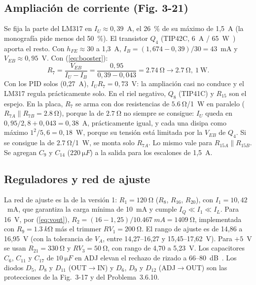 \documentclass[conference]{IEEEtran}
\begin{document}
\subsection{Ampliación de corriente (Fig. 3-21)}
Se fija la parte del LM317 en $I_U\approx0{,}39$~A, el 26~\% de su máximo de 1,5~A (la monografía pide menos del 50~\%). El transistor $Q_4$ (TIP42C, 6~A / 65~W~\cite{tip4x}) aporta el resto. Con $h_{FE}\approx30$ a 1,3~A, $I_B=(1{,}674-0{,}39)/30=43$~mA y $V_{EB}\approx0{,}95$~V. Con (\ref{eq:booster}):
\begin{equation}
R_7=\frac{V_{EB}}{I_U-I_B}=\frac{0{,}95}{0{,}39-0{,}043}=\SI{2,74}{\ohm}\rightarrow\SI{2,7}{\ohm},\ 1~\text{W}.
\end{equation}
Con los PID solos (0,27~A), $I_U R_7=0{,}73$~V: la ampliación casi no conduce y el LM317 regula prácticamente solo. En el riel negativo, $Q_8$ (TIP41C) y $R_{15}$ son el espejo. En la placa, $R_7$ se arma con dos resistencias de $\SI{5,6}{\ohm}$/1~W en paralelo ($R_{7A}\parallel R_{7B}=\SI{2,8}{\ohm}$), porque la de $\SI{2,7}{\ohm}$ no siempre se consigue: $I_U$ queda en $0{,}95/2{,}8+0{,}043=0{,}38$~A, prácticamente igual, y cada una disipa como máximo $1^2/5{,}6=0{,}18$~W, porque su tensión está limitada por la $V_{EB}$ de $Q_4$. Si se consigue la de $\SI{2,7}{\ohm}$/1~W, se monta solo $R_{7A}$. Lo mismo vale para $R_{15A}\parallel R_{15B}$. Se agregan $C_9$ y $C_{14}$ ($\SI{220}{\micro F}$) a la salida para los escalones de 1,5~A.

\subsection{Reguladores y red de ajuste}
La red de ajuste es la de la versión 1: $R_1=\SI{120}{\ohm}$ ($R_8$, $R_{16}$, $R_{20}$), con $I_1=10{,}42$~mA, que garantiza la carga mínima de 10~mA y cumple $I_Q\ll I_1\ll I_L$. Para 16~V, por (\ref{eq:vout}), $R_2=(16-1{,}25)/\SI{10,467}{mA}=\SI{1409}{\ohm}$, implementada con $R_9=\SI{1,3}{k\ohm}$ más el trimmer $RV_1=\SI{200}{\ohm}$. El rango de ajuste es de 14,86 a 16,95~V (con la tolerancia de $V_A$, entre 14,27--16,27 y 15,45--17,62~V). Para $+5$~V se usan $R_{21}=\SI{330}{\ohm}$ y $RV_3=\SI{50}{\ohm}$, con rango de 4,70 a 5,23~V. Los capacitores $C_6$, $C_{11}$ y $C_{17}$ de $\SI{10}{\micro F}$ en ADJ elevan el rechazo de rizado a 66--80~dB~\cite{lm317}. Los diodos $D_5$, $D_8$ y $D_{11}$ (OUT$\rightarrow$IN) y $D_6$, $D_9$ y $D_{12}$ (ADJ$\rightarrow$OUT) son las protecciones de la Fig.~3-17 y del Problema~3.6.10.
\end{document}
